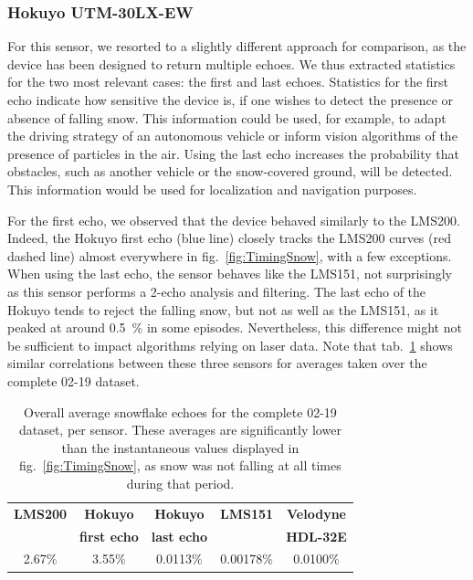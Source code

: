\subsubsection{Hokuyo UTM-30LX-EW}
For this sensor, we resorted to a slightly different approach for comparison, as the device has been designed to return multiple echoes. We thus extracted statistics for the two most relevant cases: the first and last echoes. Statistics for the first echo indicate how sensitive the device is, if one wishes to detect the presence or absence of falling snow. This information could be used, for example, to adapt the driving strategy of an autonomous vehicle or inform vision algorithms of the presence of particles in the air. Using the last echo increases the probability that obstacles, such as another vehicle or the snow-covered ground,  will be detected. This information would be used for localization and navigation purposes. 

For the first echo, we observed that the device behaved similarly to the LMS200. Indeed, the Hokuyo first echo (blue line) closely tracks the LMS200 curves (red dashed line) almost everywhere in fig.~\ref{fig:TimingSnow}, with a few exceptions.  When using the last echo, the sensor behaves like the LMS151, not surprisingly as this sensor performs a 2-echo analysis and filtering. The last echo of the Hokuyo tends to reject the falling snow, but not as well as the LMS151, as it peaked at around 0.5~\% in some episodes. Nevertheless, this difference might not be sufficient to impact algorithms relying on laser data. Note that tab.~\ref{tab:avgRates} shows similar correlations between these three sensors for averages taken over the complete 02-19 dataset. 

\begin{table}[htbp]
    \centering
    \begin{tabular}{|c|c|c|c|c|}
        \hline
        \textbf{LMS200}       & \textbf{Hokuyo}             & \textbf{Hokuyo}    & \textbf{LMS151}  & \textbf{Velodyne}  \\
                                        & \textbf{first echo}   & \textbf{last echo}  &                            & \textbf{HDL-32E}  \\\hline
                 2.67\%            &           3.55\%                &       0.0113\%      &       0.00178\%     &  0.0100\%  \\\hline
    \end{tabular}
    \caption{Overall average snowflake echoes for the complete 02-19 dataset, per sensor. These averages are significantly lower than the instantaneous values displayed in fig.~\ref{fig:TimingSnow}, as snow was not falling at all times during that period.}
    \label{tab:avgRates}
\end{table}

